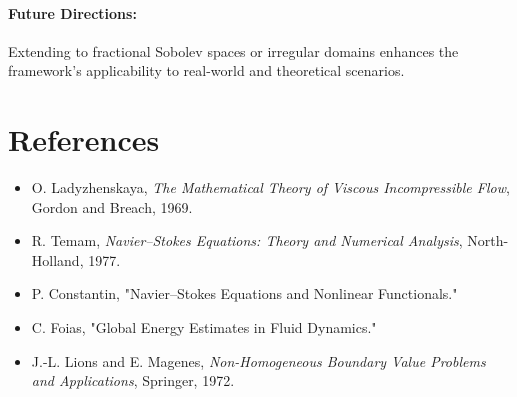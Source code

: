 \documentclass[12pt]{article}
\theoremstyle{definition}
\begin{document}
\paragraph{Future Directions:} Extending to fractional Sobolev spaces or irregular domains enhances the framework's applicability to real-world and theoretical scenarios.

\section*{References}
\begin{itemize}
    \item O. Ladyzhenskaya, \emph{The Mathematical Theory of Viscous Incompressible Flow}, Gordon and Breach, 1969.
    \item R. Temam, \emph{Navier--Stokes Equations: Theory and Numerical Analysis}, North-Holland, 1977.
    \item P. Constantin, "Navier--Stokes Equations and Nonlinear Functionals."
    \item C. Foias, "Global Energy Estimates in Fluid Dynamics."
    \item J.-L. Lions and E. Magenes, \emph{Non-Homogeneous Boundary Value Problems and Applications}, Springer, 1972.
\end{itemize}
\end{document}

